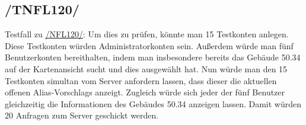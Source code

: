 \subsection*{/TNFL120/}
\label{/TNFL120/} Testfall zu \hyperref[/NFL120/]{/NFL120/}: Um dies zu prüfen, könnte man 15 Testkonten anlegen. Diese Testkonten würden \Gls{Administrator}konten sein. Außerdem würde man fünf \Gls{Benutzer}konten bereithalten, indem man insbesondere bereits das Gebäude 50.34 auf der \Gls{Kartenansicht} sucht und dies ausgewählt hat. Nun würde man den 15 Testkonten \gls{simultan} vom \Gls{Server} anfordern lassen, dass dieser die aktuellen offenen \Glspl{Alias-Vorschlag} anzeigt. Zugleich würde sich jeder der fünf \Gls{Benutzer} gleichzeitig die Informationen des Gebäudes 50.34 anzeigen lassen. Damit würden 20 Anfragen zum \Gls{Server} geschickt werden.